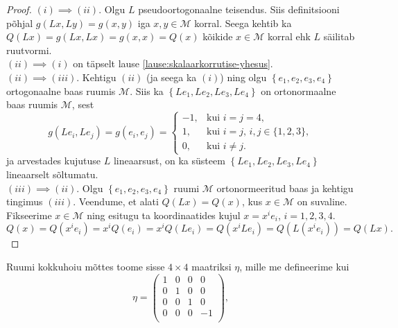 \documentclass[a4paper,12pt]{article}
\theoremstyle{plain}
\theoremstyle{definition}
\numberwithin{equation}{section}
\begin{document}
\begin{proof}
$(i) \implies (ii)$. Olgu $L$ pseudoortogonaalne teisendus. Siis definitsiooni põhjal $g\left(Lx, Ly\right) = g\left(x, y\right)$ iga $x, y \in \mathcal{M}$ korral. Seega kehtib ka $Q\left(Lx\right) = g\left(Lx, Lx\right) = g\left(x, x\right) = Q\left(x\right)$ kõikide $x \in \mathcal{M}$ korral ehk $L$ säilitab ruutvormi. \\
$(ii) \implies (i)$ on täpselt lause \ref{lause:skalaarkorrutise-yhesus}. \\
$(ii) \implies (iii)$. Kehtigu $(ii)$ (ja seega ka $(i)$) ning olgu $\left\lbrace e_1, e_2, e_3, e_4 \right\rbrace$ ortogonaalne baas ruumis $\mathcal{M}$. Siis ka $\left\lbrace Le_1, Le_2, Le_3, Le_4 \right\rbrace$ on ortonormaalne baas ruumis $\mathcal{M}$, sest
\begin{equation*}
g \left(Le_i, Le_j\right) = g\left(e_i, e_j\right) = \begin{cases}
    -1,& \text{kui $i = j = 4$},\\
    1,& \text{kui $i = j$, $i,j \in \{1, 2, 3\}$},\\
    0,& \text{kui $i \neq j$}.
  \end{cases}
\end{equation*}
ja arvestades kujutuse $L$ lineaarsust, on ka süsteem $\left\lbrace Le_1, Le_2, Le_3, Le_4 \right\rbrace$ lineaarselt sõltumatu. \\
$(iii) \implies (ii)$. Olgu $\left\lbrace e_1, e_2, e_3, e_4 \right\rbrace$ ruumi $\mathcal{M}$ ortonormeeritud baas ja kehtigu tingimus $(iii)$. Veendume, et alati $Q\left(Lx\right) = Q\left(x\right)$, kus $x \in \mathcal{M}$ on suvaline. Fikseerime $x \in \mathcal{M}$ ning esitugu ta koordinaatides kujul $x = x^i e_i$, $i = 1, 2, 3, 4$.
\begin{equation*}
Q\left(x\right) = Q\left(x^i e_i\right) = x^i Q\left(e_i\right) = x^i Q\left(Le_i\right) = Q\left(x^i L e_i\right) = Q\left(L\left(x^i e_i\right)\right) = Q\left(Lx\right).
\end{equation*}
\end{proof}
%
Ruumi kokkuhoiu mõttes toome sisse $4 \times 4$ maatriksi $\eta$, mille me defineerime kui
\begin{equation*}
\eta = \begin{pmatrix}
1 & 0 & 0 & 0 \\ 
0 & 1 & 0 & 0 \\  
0 & 0 & 1 & 0 \\ 
0 & 0 & 0 & -1 \\ 
\end{pmatrix},
\end{equation*}
\end{document}
